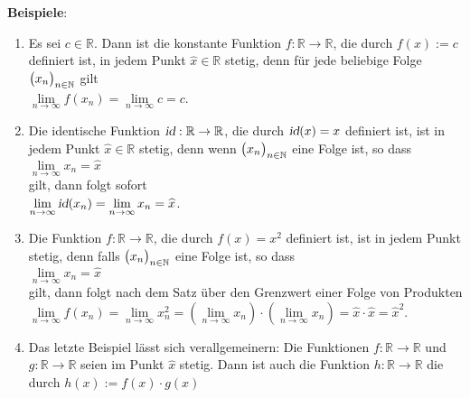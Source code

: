 \noindent
\textbf{Beispiele}:
\begin{enumerate}
\item Es sei $c \in \mathbb{R}$.  Dann ist die konstante Funktion
      $f: \mathbb{R} \rightarrow \mathbb{R}$, die durch $f(x) := c$ definiert ist, in
      jedem Punkt $\widehat{x}\in\mathbb{R}$ stetig, denn f\"ur jede beliebige Folge $\bigl(x_n\bigr)_{n\in\mathbb{N}}$ gilt 
      \\[0.2cm]
      \hspace*{1.3cm}      
      $\lim\limits_{n\rightarrow\infty} f(x_n) = \lim\limits_{n\rightarrow\infty} c = c$.
\item Die identische Funktion $\textsl{id}:\mathbb{R} \rightarrow \mathbb{R}$, die durch 
      $\textsl{id}(x) = x$ definiert ist, ist in jedem Punkt $\widehat{x}\in\mathbb{R}$ stetig,
      denn wenn $\bigl(x_n\bigr)_{n\in\mathbb{N}}$ eine Folge ist, so dass
      \\[0.2cm]
      \hspace*{1.3cm}      
      $\lim\limits_{n\rightarrow\infty} x_n = \widehat{x}$
      \\[0.2cm]
      gilt, dann folgt sofort 
      \\[0.2cm]
      \hspace*{1.3cm}      
      $\lim\limits_{n\rightarrow\infty} \textsl{id}(x_n) = \lim\limits_{n\rightarrow\infty} x_n = \widehat{x}$.
\item Die Funktion $f: \mathbb{R} \rightarrow \mathbb{R}$, die durch
      $f(x) = x^2$ definiert ist, ist in jedem Punkt stetig, denn falls
      $\bigl(x_n\bigr)_{n\in\mathbb{N}}$ eine Folge ist, so dass 
      \\[0.2cm]
      \hspace*{1.3cm}      
      $\lim\limits_{n\rightarrow\infty} x_n = \widehat{x}$ 
      \\[0.2cm]
      gilt, dann folgt nach dem Satz \"uber den Grenzwert einer Folge von Produkten
      \\[0.2cm]
      \hspace*{1.3cm}      
      $\lim\limits_{n\rightarrow\infty} f(x_n) = 
       \lim\limits_{n\rightarrow\infty} x_n^2 = 
       \left(\lim\limits_{n\rightarrow\infty} x_n\right) \cdot\left(\lim\limits_{n\rightarrow\infty} x_n\right) =
       \widehat{x} \cdot \widehat{x} = \widehat{x}^2$.
\item Das letzte Beispiel l\"asst sich verallgemeinern: Die Funktionen
      $f:\mathbb{R} \rightarrow \mathbb{R}$ und $g:\mathbb{R} \rightarrow \mathbb{R}$
      seien im Punkt $\widehat{x}$ stetig.  Dann ist auch die Funktion
      $h: \mathbb{R} \rightarrow \mathbb{R}$ die durch $h(x) := f(x) \cdot g(x)$

\end{enumerate}

